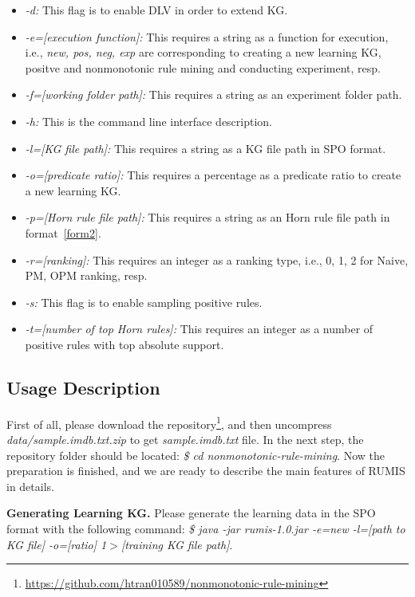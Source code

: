 \begin{itemize}
\item \textit{-d:} This flag is to enable DLV in order to extend KG.
\item \textit{-e=[execution function]:} This requires a string as a function for execution, i.e., \textit{new, pos, neg, exp} are corresponding to creating a new learning KG, positve and nonmonotonic rule mining and conducting experiment, resp.
\item \textit{-f=[working folder path]:} This requires a string as an experiment folder path.
\item \textit{-h:} This is the command line interface description.
\item \textit{-l=[KG file path]:} This requires a string as a KG file path in SPO format.
\item \textit{-o=[predicate ratio]:} This requires a percentage as a predicate ratio to create a new learning KG.
\item \textit{-p=[Horn rule file path]:} This requires a string as an Horn rule file path in format~\ref{form2}.
\item \textit{-r=[ranking]:} This requires an integer as a ranking type, i.e., 0, 1, 2 for Naive, PM, OPM ranking, resp.
\item \textit{-s:} This flag is to enable sampling positive rules.
\item \textit{-t=[number of top Horn rules]:} This requires an integer as a number of positive rules with top absolute support.
\end{itemize}

\subsection{Usage Description}

First of all, please download the repository\footnote{\url{https://github.com/htran010589/nonmonotonic-rule-mining}}, and then uncompress \textit{data/sample.imdb.txt.zip} to get \textit{sample.imdb.txt} file. In the next step, the repository folder should be located: \textit{\$ cd nonmonotonic-rule-mining}. Now the preparation is finished, and we are ready to describe the main features of RUMIS in details.

\textbf{Generating Learning KG.} Please generate the learning data in the SPO format with the following command: \textit{\$ java -jar rumis-1.0.jar -e=new -l=[path to KG file] -o=[ratio] 1$>$[training KG file path]}.

